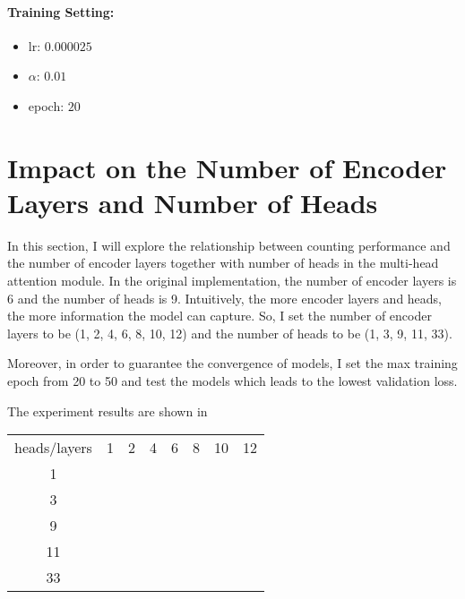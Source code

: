 \documentclass[10pt,twocolumn,letterpaper]{article}
\begin{document}
    \paragraph{Training Setting:}
    \begin{itemize}
        \item lr: $0.000025$
        \item $\alpha$: $0.01$
        \item epoch: $20$
    \end{itemize}



    \section{Impact on the Number of Encoder Layers and Number of Heads}
    \label{sec:num_layers_num_heads}
    In this section, I will explore the relationship between counting performance and the number of encoder layers
    together with number of heads in the multi-head attention module.
    In the original implementation, the number of encoder layers is 6 and the number of heads is 9.
    Intuitively, the more encoder layers and heads, the more information the model can capture.
    So, I set the number of encoder layers to be (1, 2, 4, 6, 8, 10, 12) and the number of heads to be (1, 3, 9, 11, 33).

    Moreover, in order to guarantee the convergence of models, I set the max training epoch from 20 to 50 and test the models
    which leads to the lowest validation loss.

    The experiment results are shown in

    \begin{table}
        \centering
        \begin{tabular}[H]{c c c c c c c c}
            heads/layers & 1 & 2 & 4 & 6 & 8 & 10 & 12\\
            1 & \\
            3 & \\
            9 & \\
            11 & \\
            33 & \\
        \end{tabular}
        \label{tab:num_layers_num_heads}
    \end{table}


    {\small
    
    
    }
\end{document}
